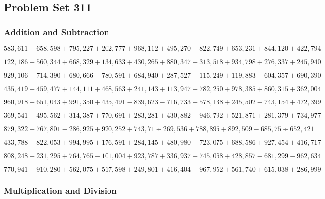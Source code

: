 \hypertarget{problem-set-311}{%
\subsection{Problem Set 311}\label{problem-set-311}}

\hypertarget{addition-and-subtraction}{%
\subsubsection{Addition and
Subtraction}\label{addition-and-subtraction}}

\(583,611+658,598+795,227+202,777+968,112+495,270+822,749+653,231+844,120+422,794\)

\(122,186+560,344+668,329+134,633+430,265+880,347+313,518+934,798+276,337+245,940\)

\(929,106-714,390+680,666-780,591+684,940+287,527-115,249+119,883-604,357+690,390\)

\(435,419+459,477+144,111+468,563+241,143+113,947+782,250+978,385+860,315+362,004\)

\(960,918-651,043+991,350+435,491-839,623-716,733+578,138+245,502-743,154+472,399\)

\(369,541+495,562+314,387+770,691+283,281+430,882+946,792+521,871+281,379+734,977\)

\(879,322+767,801-286,925+920,252+743,71÷269,536+788,895+892,509-685,75÷652,421\)

\(433,788+822,053+994,995+176,591+284,145+480,980+723,075+688,586+927,454+416,717\)

\(808,248+231,295+764,765-101,004+923,787+336,937-745,068+428,857-681,299-962,634\)

\(770,941+910,280+562,075+517,598+249,801+416,404+967,952+561,740+615,038+286,999\)

\hypertarget{multiplication-and-division}{%
\subsubsection{Multiplication and
Division}\label{multiplication-and-division}}

